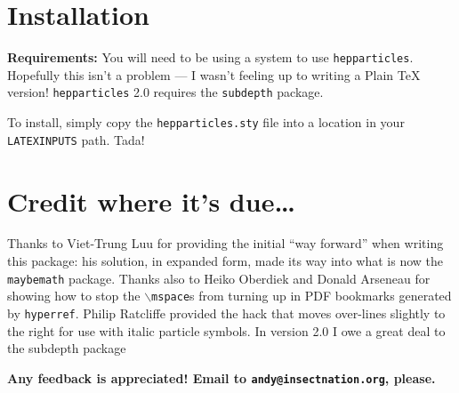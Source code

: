 \documentclass[12pt]{article}
\newcommand{\hepparticles}{\texttt{hepparticles}\xspace}
\begin{document}
\section{Installation}
\textbf{Requirements:} You will need to be using a \LaTeXe{} system to use
\hepparticles. Hopefully this isn't a problem --- I wasn't feeling up to writing
a Plain \TeX{} version! \hepparticles 2.0 requires the \texttt{subdepth} package.

To install, simply copy the \texttt{hepparticles.sty} file into a location in
your \texttt{LATEXINPUTS} path. Tada!


\section{Credit where it's due\dots}
Thanks to Viet-Trung Luu for providing the initial ``way forward'' when writing
this package: his solution, in expanded form, made its way into what is now
the \texttt{maybemath} package. Thanks also to Heiko Oberdiek and Donald Arseneau
for showing how to stop the \texttt{$\backslash{}$mspace}s from turning up in PDF
bookmarks generated by \texttt{hyperref}. Philip Ratcliffe provided the hack
that moves over-lines slightly to the right for use with italic particle symbols.
In version 2.0 I owe a great deal to the subdepth package


\vspace{2cm}
\begin{center}
\noindent \textbf{Any feedback is appreciated! Email to \texttt{andy@insectnation.org}, please.}
\end{center}


\end{document}
